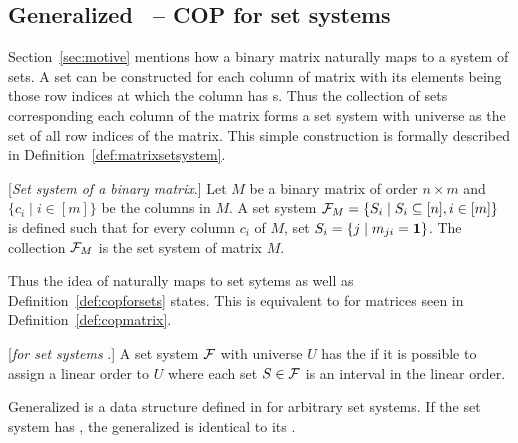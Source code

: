 %


\subsection{Generalized \PQtree\ --  COP for set systems}
\label{sec:surveycertalgo}

Section~\ref{sec:motive} mentions how a binary matrix naturally maps
to a system of sets.  A set can be constructed for each column of
matrix with its elements being those row indices at which the column
has \un s. Thus the collection of sets corresponding each column of
the matrix forms a set system with universe as the set of all row
indices of the matrix.  This simple construction is formally described
in Definition~\ref{def:matrixsetsystem}.

\begin{definition}%
  \label{def:matrixsetsystem}%
  [\emph{Set system of a binary matrix}.] Let $M$ be a binary matrix
  of order $n \times m$ %
  and $\{c_i \mid i \in [m]\}$ be the columns in $M$. A set system
  ${\cal F}_{M} = \{S_i \mid S_i \subseteq [n], i \in [m]\}$ is defined
  such that for every column $c_i$ of $M$, set $S_i = \{j \mid m_{ji}
  = \textbf{1} \}$. The collection ${\cal F}_M$ is the set system of matrix $M$.
\end{definition}

Thus the idea of \cop naturally maps to set sytems as well as
Definition~\ref{def:copforsets} states. This is equivalent to \COP for
matrices seen in Definition~\ref{def:copmatrix}.

\begin{definition}%
  \label{def:copforsets}%
  [\emph{\Cop for set systems%
  }.] A set system ${\cal F}$ with universe $U$ has the \cop if it is
  possible to assign a linear order to $U$ where each set $S \in {\cal F}$
  is an interval in the linear order.
\end{definition}

Generalized \PQtree is a data structure defined in \cite{mcc04} for
arbitrary set systems. If the set system has \COP, the generalized
\PQtree is identical to its \PQtree. 

